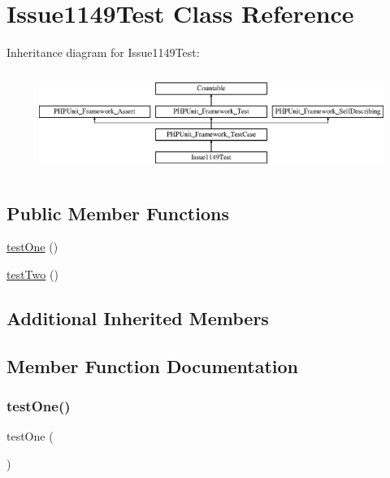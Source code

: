 \hypertarget{class_issue1149_test}{}\section{Issue1149\+Test Class Reference}
\label{class_issue1149_test}
Inheritance diagram for Issue1149\+Test\+:\begin{figure}[H]
\begin{center}
\leavevmode
\includegraphics[height=3.303835cm]{class_issue1149_test}
\end{center}
\end{figure}
\subsection*{Public Member Functions}
\begin{DoxyCompactItemize}
\item 
\mbox{\hyperlink{class_issue1149_test_afbf3ff88b322c6a7197ce02297cd23a0}{test\+One}} ()
\item 
\mbox{\hyperlink{class_issue1149_test_a4fb9974ce113d5d1db8075e0db0dc9b6}{test\+Two}} ()
\end{DoxyCompactItemize}
\subsection*{Additional Inherited Members}


\subsection{Member Function Documentation}
\mbox{\label{class_issue1149_test_afbf3ff88b322c6a7197ce02297cd23a0}} 
\subsubsection{\texorpdfstring{test\+One()}{testOne()}}
{\footnotesize\ttfamily test\+One (\begin{DoxyParamCaption}{ }\end{DoxyParamCaption})}

